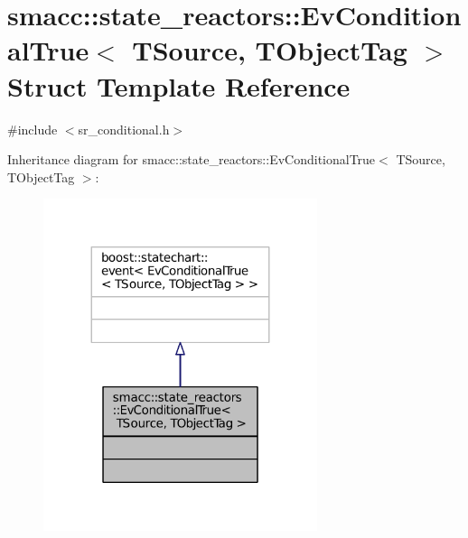 \hypertarget{structsmacc_1_1state__reactors_1_1EvConditionalTrue}{}\section{smacc\+:\+:state\+\_\+reactors\+:\+:Ev\+Conditional\+True$<$ T\+Source, T\+Object\+Tag $>$ Struct Template Reference}
\label{structsmacc_1_1state__reactors_1_1EvConditionalTrue}


{\ttfamily \#include $<$sr\+\_\+conditional.\+h$>$}



Inheritance diagram for smacc\+:\+:state\+\_\+reactors\+:\+:Ev\+Conditional\+True$<$ T\+Source, T\+Object\+Tag $>$\+:
\nopagebreak
\begin{figure}[H]
\begin{center}
\leavevmode
\includegraphics[width=227pt]{structsmacc_1_1state__reactors_1_1EvConditionalTrue__inherit__graph}
\end{center}
\end{figure}


